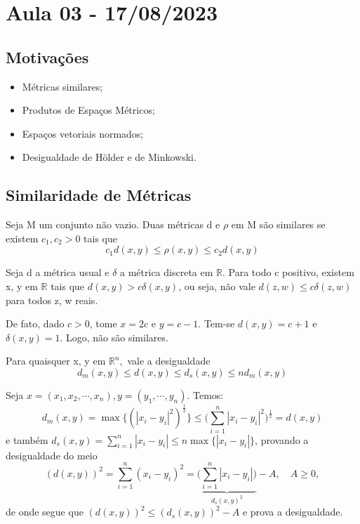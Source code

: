 \documentclass[MetricSpaces/metric_notes.tex]{subfiles}
\begin{document}
\section{Aula 03 - 17/08/2023}
\subsection{Motivações}
\begin{itemize}
	\item Métricas similares;
	\item Produtos de Espaços Métricos;
	\item Espaços vetoriais normados;
	\item Desigualdade de Hölder e de Minkowski.
\end{itemize}
\subsection{Similaridade de Métricas}
\begin{def*}
	Seja M um conjunto não vazio. Duas métricas d e \(\rho \) em M são similares se existem \(c_{1}, c_{2} > 0\) tais que
	\[
		c_{1}d(x, y)\leq \rho (x, y)\leq c_{2}d(x, y)
	\]
\end{def*}
\begin{example}
	Seja d a métrica usual e \(\delta  \) a métrica discreta em \(\mathbb{R}\). Para todo c positivo, existem
	x, y em \(\mathbb{R}\) tais que \(d(x, y) > c\delta (x, y)\), ou seja, não vale \(d(z, w)\leq c\delta (z, w)\) para todos
	z, w reais.

	De fato, dado \(c > 0\), tome \(x=2c\) e \(y=c-1.\) Tem-se \(d(x, y) = c + 1\) e \(\delta (x, y) = 1\). Logo, não são similares.
\end{example}
\begin{prop*}
	Para quaisquer x, y em \(\mathbb{R}^{n},\) vale a desigualdade
	\[
		d_{m}(x,y)\leq d(x,y)\leq d_{s}(x, y)\leq nd_{m}(x,y)
	\]
\end{prop*}
\begin{proof*}
	Seja \(x=(x_{1}, x_{2}, \cdots, x_{n}), y = (y_{1}, \cdots, y_{n})\). Temos:
	\[
		d_{m}(x, y) = \max \biggl\{(|x_{i}-y_{i}|^{2})^{\frac{1}{2}}\biggr\}\leq \biggl(\sum\limits_{i=1}^{n}|x_{i}-y_{i}|^{2}\biggr)^{\frac{1}{2}} = d(x, y)
	\]
	e também \(d_{s}(x, y) = \sum\limits_{i=1}^{n}|x_{i}-y_{i}|\leq n\max \biggl\{|x_{i}-y_{i}|\biggr\}\),
	provando a desigualdade do meio
	\[
		(d(x,y))^{2} = \sum\limits_{i=1}^{n}(x_{i}-y_{i})^{2} = \underbrace{\biggl(\sum\limits_{i=1}^{n}|x_{i}-y_{i}|\biggr)}_{d_{s}(x, y)^{2}} - A,\quad A\geq 0,
	\]
	de onde segue que \((d(x, y))^{2}\leq (d_{s}(x, y))^{2} - A\) e prova a desigualdade. \qedsymbol
\end{proof*}
\end{document}
